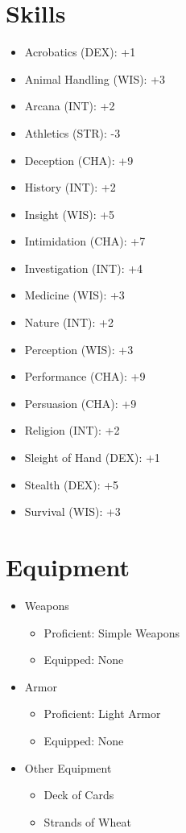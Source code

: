 \documentclass[11pt]{article}
\begin{document}
\section{Skills}
\label{sec:org2ec59d3}
\begin{itemize}
\item Acrobatics (DEX): +1
\item Animal Handling (WIS): +3
\item Arcana (INT): +2
\item Athletics (STR): -3
\item Deception (CHA): +9
\item History (INT): +2
\item Insight (WIS): +5
\item Intimidation (CHA): +7
\item Investigation (INT): +4
\item Medicine (WIS): +3
\item Nature (INT): +2
\item Perception (WIS): +3
\item Performance (CHA): +9
\item Persuasion (CHA): +9
\item Religion (INT): +2
\item Sleight of Hand (DEX): +1
\item Stealth (DEX): +5
\item Survival (WIS): +3
\end{itemize}
\section{Equipment}
\label{sec:orgc2f7e93}
\begin{itemize}
\item Weapons
\begin{itemize}
\item Proficient: Simple Weapons
\item Equipped: None
\end{itemize}
\item Armor
\begin{itemize}
\item Proficient: Light Armor
\item Equipped: None
\end{itemize}
\item Other Equipment
\begin{itemize}
\item Deck of Cards
\item Strands of Wheat
\end{itemize}
\end{itemize}
\end{document}
